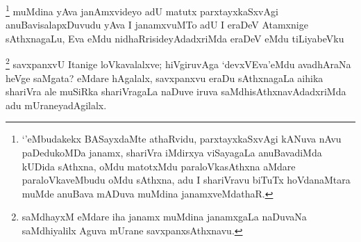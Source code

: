 
\begin{artha}
\footnote[1]{`\stext'eMbudakekx BASayxdaMte athaRvidu, parxtayxkaSxvAgi kANuva nAvu paDedukoMDa janamx, shariVra iMdirxya viSayagaLa anuBavadiMda kUDida sAthxna, oMdu matotxMdu paraloVkasAthxna aMdare paraloVkaveMbudu oMdu sAthxna, adu I shariVravu biTuTx hoVdanaMtara muMde anuBava mADuva muMdina janamxveMdathaR.}
muMdina yAva janAmxvideyo adU matutx parxtayxkaSxvAgi anuBavisalapxDuvudu yAva I janamxvuMTo adU I eraDeV Atamxnige sAthxnagaLu, Eva eMdu nidhaRrisideyAdadxriMda eraDeV eMdu tiLiyabeVku 
\end{artha}


\begin{artha}
\footnote[2]{saMdhayxM eMdare iha janamx muMdina janamxgaLa naDuvaNa saMdhiyalilx Aguva mUrane savxpanxsAthxnavu.}
savxpanxvU Itanige loVkavalalxve; hiVgiruvAga `devxVEva'eMdu avadhAraNa heVge saMgata? eMdare hAgalalx, savxpanxvu eraDu sAthxnagaLa aihika shariVra ale muSiRka shariVragaLa naDuve iruva saMdhisAthxnavAdadxriMda adu mUraneyadAgilalx. 
\end{artha}


